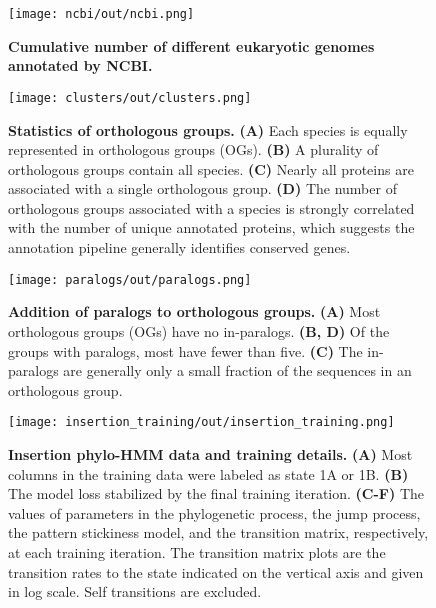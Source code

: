 \begin{figure}[h!]
\texttt{[image: ncbi/out/ncbi.png]}
\centering
\caption{\textbf{Cumulative number of different eukaryotic genomes annotated by NCBI.}}
\label{sfig:ncbi}
\end{figure}

\begin{figure}[h!]
\texttt{[image: clusters/out/clusters.png]}
\centering
\caption{\textbf{Statistics of orthologous groups.}
\textbf{(A)} Each species is equally represented in orthologous groups (OGs). \textbf{(B)} A plurality of orthologous groups contain all species. \textbf{(C)} Nearly all proteins are associated with a single orthologous group. \textbf{(D)} The number of orthologous groups associated with a species is strongly correlated with the number of unique annotated proteins, which suggests the annotation pipeline generally identifies conserved genes.}
\label{sfig:clusters}
\end{figure}

\begin{figure}[h!]
\texttt{[image: paralogs/out/paralogs.png]}
\centering
\caption{\textbf{Addition of paralogs to orthologous groups.}
\textbf{(A)} Most orthologous groups (OGs) have no in-paralogs. \textbf{(B, D)} Of the groups with paralogs, most have fewer than five. \textbf{(C)} The in-paralogs are generally only a small fraction of the sequences in an orthologous group.}
\label{sfig:paralogs}
\end{figure}

\begin{figure}[h!]
\texttt{[image: insertion\_training/out/insertion\_training.png]}
\centering
\caption{\textbf{Insertion phylo-HMM data and training details.}
\textbf{(A)} Most columns in the training data were labeled as state 1A or 1B. \textbf{(B)} The model loss stabilized by the final training iteration. \textbf{(C-F)} The values of parameters in the phylogenetic process, the jump process, the pattern stickiness model, and the transition matrix, respectively, at each training iteration. The transition matrix plots are the transition rates to the state indicated on the vertical axis and given in log scale. Self transitions are excluded.}
\label{sfig:insertion_training}
\end{figure}


